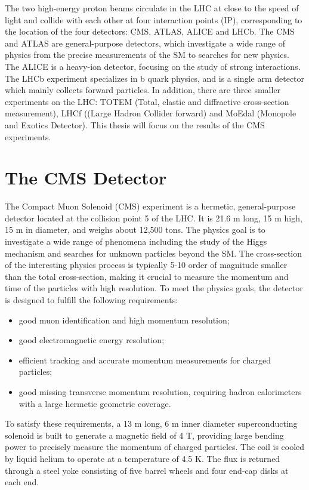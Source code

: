 \documentclass[thesis.tex]{subfiles}
\begin{document}
The two high-energy proton beams circulate in the LHC at close to the speed of light and collide with each other at four interaction points (IP), corresponding to the location of the four detectors: CMS, ATLAS, ALICE and LHCb. 
The CMS and ATLAS are general-purpose detectors, which investigate a wide range of physics from the precise measurements of the SM to searches for new physics. 
The ALICE is a heavy-ion detector, focusing on the study of strong interactions. 
The LHCb experiment specializes in b quark physics, and is a single arm detector which mainly collects forward particles. 
In addition, there are three smaller experiments on the LHC: TOTEM (Total, elastic and diffractive cross-section measurement), LHCf ((Large Hadron Collider forward) and MoEdal (Monopole and Exotics Detector). 
This thesis will focus on the results of the CMS experiments. 

\section{The CMS Detector}

The Compact Muon Solenoid (CMS) experiment is a hermetic, general-purpose detector located at the collision point 5 of the LHC.  It is 21.6 m long, 15 m high, 15 m in diameter, and weighs about 12,500 tons. The physics goal is to investigate a wide range of phenomena including the study of the Higgs mechanism and searches for unknown particles beyond the SM. The cross-section of the interesting physics process is typically 5-10 order of magnitude smaller than the total cross-section, making it crucial to measure the momentum and time of the particles with high resolution. To meet the physics goals, the detector is designed to fulfill the following requirements:   
\begin{itemize}
\item good muon identification and high momentum resolution;
\item good electromagnetic energy resolution;
\item efficient tracking and accurate momentum measurements for charged particles;
\item good missing transverse momentum resolution, requiring hadron calorimeters with a large hermetic geometric coverage. 
\end{itemize}

To satisfy these requirements, a 13 m long, 6 m inner diameter superconducting solenoid is built to generate a magnetic field of 4 T, providing large bending power to precisely measure the momentum of charged particles. The coil is cooled by liquid helium to operate at a temperature of 4.5 K. The flux is returned through a steel yoke consisting of five barrel wheels and four end-cap disks at each end. 
\end{document}
